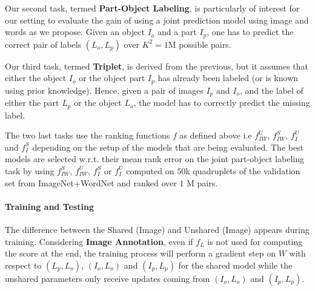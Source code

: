 

Our second task, termed {\bf Part-Object Labeling}, is particularly of
interest for our setting to evaluate the gain of using a joint
prediction model using image and words as we propose.  Given an object
$I_o$ and a part $I_p$, one has to predict the correct pair of
labels $(L_o,L_p)$ over $K^2=1$M possible pairs.



Our third task, termed {\bf Triplet}, is derived from the previous, but it assumes that
either the object $I_o$ or the object part $I_p$ has already been
labeled (or is known using prior knowledge).  Hence, given a pair of
images $I_p$ and $I_o$, and the label of either the part $L_p$ or the
object $L_o$, the model has to correctly predict the missing label.


The two last tasks use the ranking functions $f$ as defined above i.e $f_{IW}^U$,
$f_{IW}^S$, $f_I^U$ and  $f_I^S$ depending on the setup of the models that are
being evaluated.  The best models are selected w.r.t. their mean rank error on
the joint part-object labeling task by using $f_{IW}^S$, $f_{IW}^U$, $f_I^S$ or
$f_I^U$ computed on $50$k quadruplets of the validation set from
ImageNet+WordNet and ranked over $1$ M  pairs. 

\paragraph{Training and Testing}


The difference between the Shared (Image) and Unshared (Image) appears during
training. Considering {\bf Image Annotation}, even if $f_L$ is not used for
computing the score at the end, the training process will perform a gradient
step on $W$ with respect to $(L_p,L_o)$, $(I_o, L_o)$ and $(I_p,L_p)$ for the
shared model while the unshared parameters only receive updates coming from
$(I_o,L_o)$ and $(I_p,L_p)$.

